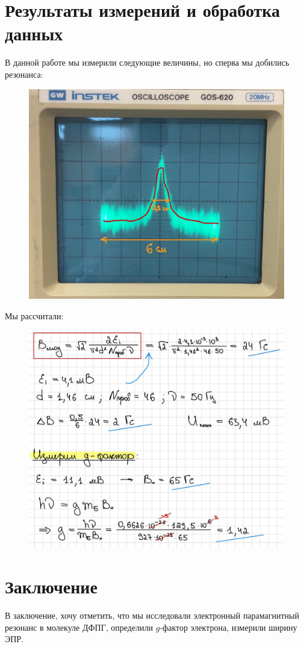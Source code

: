 \documentclass[a4paper, 12pt]{article}
\begin{document}
\newpage

    
\section{Результаты измерений и обработка данных} 
    В данной работе мы измерили следующие величины, но сперва мы добились резонанса:
    \begin{figure}[H]
        \centering
        \includegraphics[width=0.6\linewidth]{res/2.png}
    \end{figure}

    Мы рассчитали:
    \begin{figure}[H]
        \centering
        \includegraphics[width=0.7\linewidth]{res/3.png}
    \end{figure}
    
\section{Заключение}
    В заключение, хочу отметить, что мы исследовали электронный парамагнитный резонанс в молекуле ДФПГ, определили $g$-фактор электрона, измерили ширину ЭПР.
    
\end{document}

